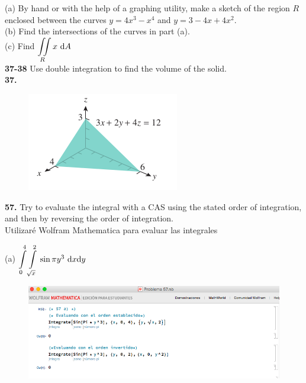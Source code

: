 \documentclass[11pt]{report}
\begin{document}
(a) By hand or with the help of a graphing utility, make a sketch of the region
$R$ enclosed between the curves $y = 4x^3 - x^4$ and $y = 3 - 4x + 4x^2$. \\

(b) Find the intersections of the curves in part (a). \\

(c) Find $ {\displaystyle \iint \limits_R } \, x \, \, \text dA $ \\

\textbf{37-38} Use double integration to find the volume of the solid. \\

\textbf{37.} \\

\begin{figure}[h]
\includegraphics[scale=0.5]{img1.png}
\centering
\end{figure}

\textbf{57.} Try to evaluate the integral with a CAS using the stated order of
integration, and then by reversing the order of integration.\\

Utilizar\'{e} Wolfram Mathematica para evaluar las integrales

(a) $ {\displaystyle \int \limits_0^4 \int \limits_{\sqrt{x}}^2 } \, \sin{\pi y^3} \, \, \text dx \text dy $ \\
\begin{figure}[h]
\includegraphics[scale=0.5]{img4.png}
\centering
\end{figure}
\end{document}
